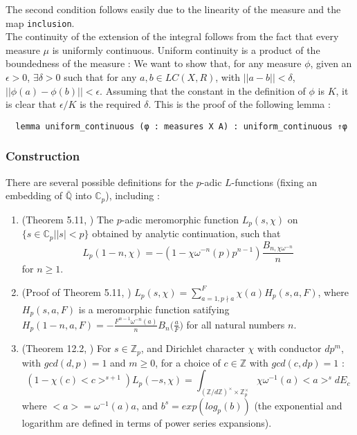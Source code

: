 \documentclass[11pt]{article}
\newcommand{\lean}[1]{\texttt{#1}\xspace} %
\begin{document}
The second condition follows easily due to the linearity of the measure and the map \lean{inclusion}. \\

The continuity of the extension of the integral follows from the fact that every measure $\mu$ is uniformly continuous. Uniform continuity is a 
product of the boundedness of the measure : We want to show that, for any measure $\phi$, given an $\epsilon > 0$, $\exists \delta > 0$ such that 
for any $a, b \in LC(X, R)$, with $||a - b|| < \delta$, $|| \phi (a) - \phi (b) || < \epsilon$. Assuming that the constant in the definition of $\phi$ 
is $K$, it is clear that $\epsilon / K$ is the required $\delta$. This is the proof of the following lemma :
\begin{lstlisting}
  lemma uniform_continuous (φ : measures X A) : uniform_continuous ⇑φ 
\end{lstlisting}

\subsubsection{Construction}
There are several possible definitions for the $p$-adic $L$-functions (fixing an embedding of
$\mathbb{\bar{\mathbb{Q}}}$ into $\mathbb{C}_p$), including :
\begin{enumerate}{}{}
  \item (Theorem 5.11, \cite{cyc}) The $p$-adic meromorphic function $L_p(s, \chi)$ on
  \newline $\{ s \in \mathbb{C}_p | |s| < p \}$ obtained by analytic continuation, such that
  $$ L_p (1 - n, \chi) = -(1 - \chi \omega^{-n}(p)p^{n - 1}) \frac{B_{n, \chi \omega^{-n}}}{n} $$
  for $n \ge 1$.
  \item (Proof of Theorem 5.11, \cite{cyc})
  $L_p(s, \chi) = \sum_{a = 1, p\nmid a}^F \chi(a)H_p(s, a, F)$, where $H_p (s, a, F)$ is a 
  meromorphic function satifying 
  \newline $H_p(1 - n, a, F) = - \frac{F^{n - 1}\omega^{-n}(a)}{n} B_n \big( \frac{a}{F} \big)$ for all 
  natural numbers $n$.
  \item (Theorem 12.2, \cite{cyc}) For $s \in \mathbb{Z}_p$, and Dirichlet character $\chi$ with
  conductor $d p^m$, with $gcd (d, p) = 1$ and $m \ge 0$, for a choice of $c \in \mathbb{Z}$
  with $gcd (c, dp) = 1$ :
  $$ (1 - \chi(c)<c>^{s+1}) L_p(-s, \chi) = \int_{(\mathbb{Z}/d \mathbb{Z})^{\times} \times \mathbb{Z}_p^{\times}}
  \chi \omega^{-1}(a) <a>^s dE_c $$
  where $<a> = \omega^{-1}(a) a$, and $b^s = exp (log_p (b))$ (the exponential and logarithm are defined in 
  terms of power series expansions).
\end{enumerate}
\end{document}
